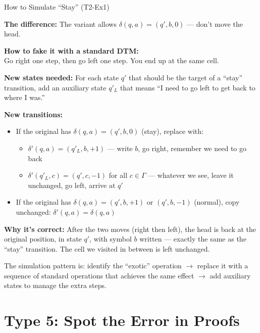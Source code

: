 \documentclass[11pt,a4paper]{article}
\newcommand{\keytakeaway}[1]{%
  \par\vspace{0.3em}%
  \colorbox{yellow!60}{\parbox{\dimexpr\linewidth-2\fboxsep}{#1}}%
  \vspace{0.3em}}
\begin{document}
\begin{examplebox}{How to Simulate ``Stay'' (T2-Ex1)}

\textbf{The difference:} The variant allows $\delta(q,a) = (q', b, 0)$ --- don't move the head.

\textbf{How to fake it with a standard DTM:}\\
Go right one step, then go left one step. You end up at the same cell.

\textbf{New states needed:} For each state $q'$ that should be the target of a ``stay'' transition, add an auxiliary state $q'_L$ that means ``I need to go left to get back to where I was.''

\textbf{New transitions:}
\begin{itemize}
    \item If the original has $\delta(q, a) = (q', b, 0)$ (stay), replace with:
    \begin{itemize}
        \item $\delta'(q, a) = (q'_L, b, +1)$ --- write $b$, go right, remember we need to go back
        \item $\delta'(q'_L, c) = (q', c, -1)$ for all $c \in \Gamma$ --- whatever we see, leave it unchanged, go left, arrive at $q'$
    \end{itemize}
    \item If the original has $\delta(q, a) = (q', b, +1)$ or $(q', b, -1)$ (normal), copy unchanged: $\delta'(q, a) = \delta(q, a)$
\end{itemize}

\textbf{Why it's correct:} After the two moves (right then left), the head is back at the original position, in state $q'$, with symbol $b$ written --- exactly the same as the ``stay'' transition. The cell we visited in between is left unchanged.

\keytakeaway{The simulation pattern is: identify the ``exotic'' operation $\to$ replace it with a sequence of standard operations that achieves the same effect $\to$ add auxiliary states to manage the extra steps.}
\end{examplebox}

\newpage
\section{Type 5: Spot the Error in Proofs}
\end{document}
